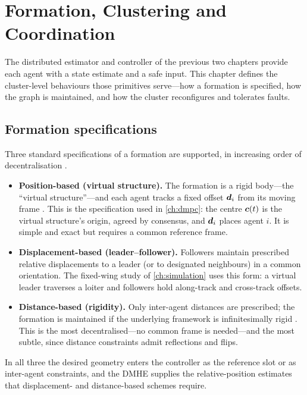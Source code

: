 \chapter{Formation, Clustering and Coordination}
\label{ch:formation}

The distributed estimator and controller of the previous two chapters provide
each agent with a state estimate and a safe input. This chapter defines the
cluster-level behaviours those primitives serve---how a formation is specified,
how the graph is maintained, and how the cluster reconfigures and tolerates
faults.

\section{Formation specifications}

Three standard specifications of a formation are supported, in increasing order
of decentralisation \cite{oh2015survey}.
\begin{itemize}[leftmargin=1.4em]
  \item \textbf{Position-based (virtual structure).} The formation is a rigid
        body---the ``virtual structure''---and each agent tracks a fixed offset
        $\bm{d}_i$ from its moving frame \cite{ren2004formation}. This is the
        specification used in \cref{ch:dmpc}: the centre $\bm{c}(t)$ is the
        virtual structure's origin, agreed by consensus, and $\bm{d}_i$ places
        agent $i$. It is simple and exact but requires a common reference frame.
  \item \textbf{Displacement-based (leader--follower).} Followers maintain
        prescribed relative displacements to a leader (or to designated
        neighbours) in a common orientation. The fixed-wing study of
        \cref{ch:simulation} uses this form: a virtual leader traverses a loiter
        and followers hold along-track and cross-track offsets.
  \item \textbf{Distance-based (rigidity).} Only inter-agent distances are
        prescribed; the formation is maintained if the underlying framework is
        infinitesimally rigid \cite{krick2009stabilisation}. This is the most
        decentralised---no common frame is needed---and the most subtle, since
        distance constraints admit reflections and flips.
\end{itemize}
In all three the desired geometry enters the controller as the reference slot or
as inter-agent constraints, and the DMHE supplies the relative-position estimates
that displacement- and distance-based schemes require.

